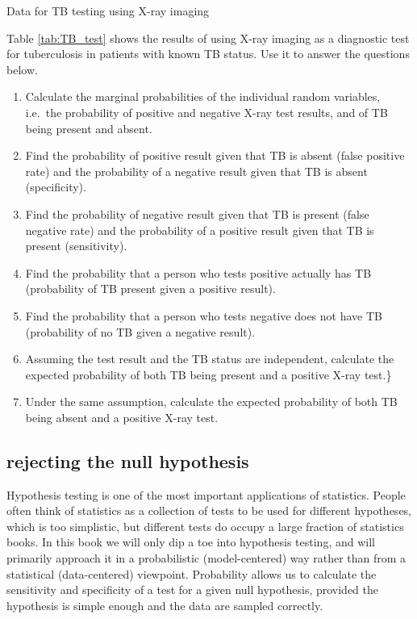 \documentclass[
]{book}
\theoremstyle{definition}
\theoremstyle{definition}
\theoremstyle{definition}
\theoremstyle{remark}
\begin{document}
Data for TB testing using X-ray imaging

Table \ref{tab:TB_test} shows the results of using X-ray imaging as a diagnostic test for tuberculosis in patients with known TB status. Use it to answer the questions below.

\begin{enumerate}
\def\labelenumi{\arabic{enumi}.}
\item
  Calculate the marginal probabilities of the individual random variables, i.e.~the probability of positive and negative X-ray test results, and of TB being present and absent.
\item
  Find the probability of positive result given that TB is absent (false positive rate) and the probability of a negative result given that TB is absent (specificity).
\item
  Find the probability of negative result given that TB is present (false negative rate) and the probability of a positive result given that TB is present (sensitivity).
\item
  Find the probability that a person who tests positive actually has TB (probability of TB present given a positive result).
\item
  Find the probability that a person who tests negative does not have TB (probability of no TB given a negative result).
\item
  Assuming the test result and the TB status are independent, calculate the expected probability of both TB being present and a positive X-ray test.\}
\item
  Under the same assumption, calculate the expected probability of both TB being absent and a positive X-ray test.
\end{enumerate}

\hypertarget{rejecting-the-null-hypothesis}{%
\subsection{rejecting the null hypothesis}\label{rejecting-the-null-hypothesis}}

Hypothesis testing is one of the most important applications of statistics. People often think of statistics as a collection of tests to be used for different hypotheses, which is too simplistic, but different tests do occupy a large fraction of statistics books. In this book we will only dip a toe into hypothesis testing, and will primarily approach it in a probabilistic (model-centered) way rather than from a statistical (data-centered) viewpoint. Probability allows us to calculate the sensitivity and specificity of a test for a given null hypothesis, provided the hypothesis is simple enough and the data are sampled correctly.
\end{document}

